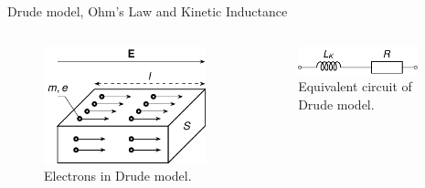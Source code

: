\begin{frame}{Drude model, Ohm's Law and Kinetic Inductance}
\begin{columns}
    \vspace{-8mm}
    \begin{figure}[!htb]
        \centering
        \includegraphics[width=\textwidth]{Figures/Electrons_in_Drude_model.pdf}
        \caption{Electrons in Drude model.}
        \label{Drude_model}
    \end{figure}
    \vspace{-6mm}
    \begin{figure}[!htb]
        \centering
        \includegraphics[width=0.9\textwidth]{Figures/Equivalent_circuit_of_Drude_model.pdf}
        \caption{Equivalent circuit of Drude model.}
        \label{Equivalent_circuit_of_Drude_model}
    \end{figure}
    
\end{columns}
    
\end{frame}
